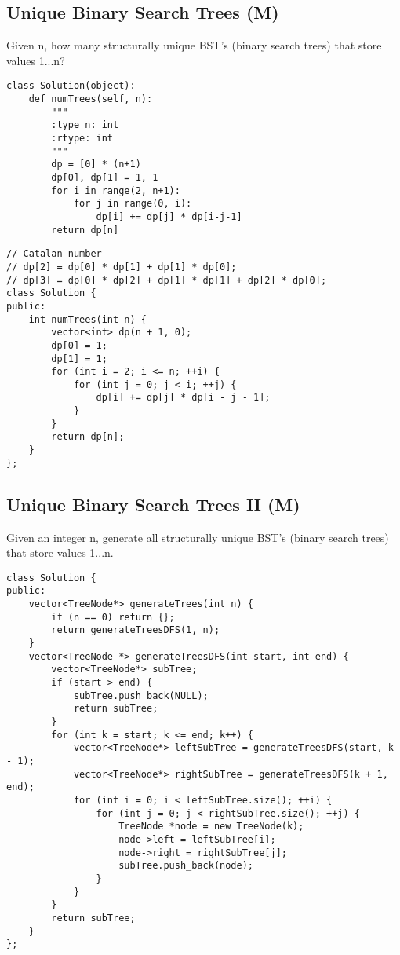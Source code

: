 \subsection{Unique Binary Search Trees (M)}
Given n, how many structurally unique BST's (binary search trees) that store values 1...n?

\begin{lstlisting}
class Solution(object):    
    def numTrees(self, n):
        """
        :type n: int
        :rtype: int
        """
        dp = [0] * (n+1)
        dp[0], dp[1] = 1, 1
        for i in range(2, n+1):
            for j in range(0, i):
                dp[i] += dp[j] * dp[i-j-1]
        return dp[n]
\end{lstlisting}

\begin{lstlisting}
// Catalan number
// dp[2] = dp[0] * dp[1] + dp[1] * dp[0];
// dp[3] = dp[0] * dp[2] + dp[1] * dp[1] + dp[2] * dp[0];
class Solution {
public:
    int numTrees(int n) {
        vector<int> dp(n + 1, 0);
        dp[0] = 1;
        dp[1] = 1;
        for (int i = 2; i <= n; ++i) {          
            for (int j = 0; j < i; ++j) {
                dp[i] += dp[j] * dp[i - j - 1];
            }
        }
        return dp[n];
    }
};
\end{lstlisting}


\subsection{Unique Binary Search Trees II (M)}
Given an integer n, generate all structurally unique BST's (binary search trees) that store values 1...n.

\begin{lstlisting}
class Solution {
public:
    vector<TreeNode*> generateTrees(int n) {
        if (n == 0) return {};
        return generateTreesDFS(1, n);
    }
    vector<TreeNode *> generateTreesDFS(int start, int end) {
        vector<TreeNode*> subTree;
        if (start > end) {
            subTree.push_back(NULL);
            return subTree;
        }
        for (int k = start; k <= end; k++) {
            vector<TreeNode*> leftSubTree = generateTreesDFS(start, k - 1);
            vector<TreeNode*> rightSubTree = generateTreesDFS(k + 1, end);
            for (int i = 0; i < leftSubTree.size(); ++i) {
                for (int j = 0; j < rightSubTree.size(); ++j) {
                    TreeNode *node = new TreeNode(k);
                    node->left = leftSubTree[i];
                    node->right = rightSubTree[j];
                    subTree.push_back(node);
                }
            }
        }
        return subTree;
    }
};
\end{lstlisting}


